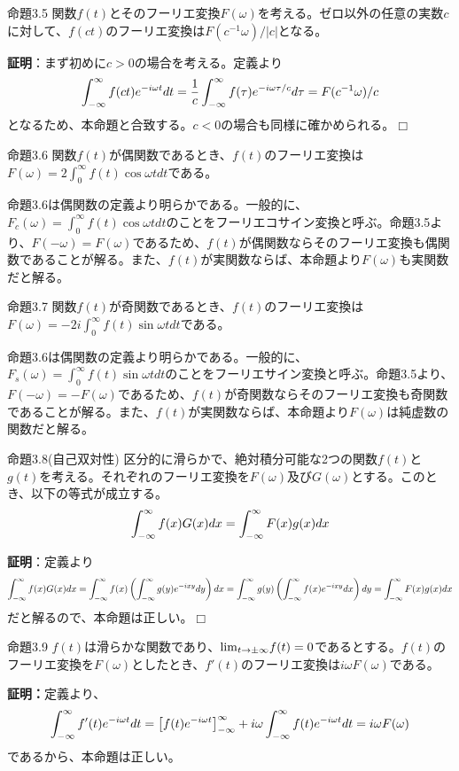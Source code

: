 \documentclass[dvipdfmx, 9pt, a4paper]{jsarticle}
\def\qed{\hfill $\Box$}
\begin{document}
\begin{itembox}[l]{命題3.5}
関数$f(t)$とそのフーリエ変換$F(\omega)$を考える。ゼロ以外の任意の実数$c$に対して、$f(ct)$のフーリエ変換は$F(c^{-1}\omega)/|c|$となる。
\end{itembox}
{\bf 証明}：まず初めに$c>0$の場合を考える。定義より
\begin{equation}
\int_{-\infty}^\infty f(ct)e^{-i\omega t}dt=\frac{1}{c}\int_{-\infty}^\infty f(\tau)e^{-i\omega \tau/c}d\tau=F(c^{-1}\omega)/c \notag
\end{equation}
となるため、本命題と合致する。$c<0$の場合も同様に確かめられる。\qed
\begin{itembox}[l]{命題3.6}
関数$f(t)$が偶関数であるとき、$f(t)$のフーリエ変換は$F(\omega)=2\int_0^\infty f(t)\cos \omega tdt$である。
\end{itembox}
命題3.6は偶関数の定義より明らかである。一般的に、$F_c(\omega)=\int_0^\infty f(t)\cos \omega tdt$のことをフーリエコサイン変換と呼ぶ。命題3.5より、$F(-\omega)=F(\omega)$であるため、$f(t)$が偶関数ならそのフーリエ変換も偶関数であることが解る。また、$f(t)$が実関数ならば、本命題より$F(\omega)$も実関数だと解る。\par
\begin{itembox}[l]{命題3.7}
関数$f(t)$が奇関数であるとき、$f(t)$のフーリエ変換は$F(\omega)=-2i\int_0^\infty f(t)\sin \omega tdt$である。
\end{itembox}
命題3.6は偶関数の定義より明らかである。一般的に、$F_s(\omega)=\int_0^\infty f(t)\sin \omega tdt$のことをフーリエサイン変換と呼ぶ。命題3.5より、$F(-\omega)=-F(\omega)$であるため、$f(t)$が奇関数ならそのフーリエ変換も奇関数であることが解る。また、$f(t)$が実関数ならば、本命題より$F(\omega)$は純虚数の関数だと解る。\par

\begin{itembox}[l]{命題3.8(自己双対性)}
区分的に滑らかで、絶対積分可能な2つの関数$f(t)$と$g(t)$を考える。それぞれのフーリエ変換を$F(\omega)$及び$G(\omega)$とする。このとき、以下の等式が成立する。
\begin{equation}
\int_{-\infty}^\infty f(x)G(x)dx=\int_{-\infty}^\infty F(x)g(x)dx \notag
\end{equation}
\end{itembox}
{\bf 証明}：定義より
\begin{equation}
\int_{-\infty}^\infty f(x)G(x)dx=\int_{-\infty}^\infty f(x)\left(\int_{-\infty}^\infty g(y)e^{-ixy}dy\right)dx=\int_{-\infty}^\infty g(y)\left(\int_{-\infty}^\infty f(x)e^{-ixy}dx\right)dy=\int_{-\infty}^\infty F(x)g(x)dx \notag
\end{equation}
だと解るので、本命題は正しい。\qed
\begin{itembox}[l]{命題3.9}
$f(t)$は滑らかな関数であり、${\rm lim}_{t \to \pm \infty}f(t)=0$であるとする。$f(t)$のフーリエ変換を$F(\omega)$としたとき、$f'(t)$のフーリエ変換は$i\omega F(\omega)$である。
\end{itembox}
{\bf 証明：}定義より、
\begin{equation}
\int_{-\infty}^\infty f'(t)e^{-i\omega t}dt=\left[f(t)e^{-i\omega t}\right]_{-\infty}^\infty + i\omega \int_{-\infty}^\infty f(t)e^{-i\omega t}dt=i\omega F(\omega) \notag
\end{equation}
であるから、本命題は正しい。
\end{document}
